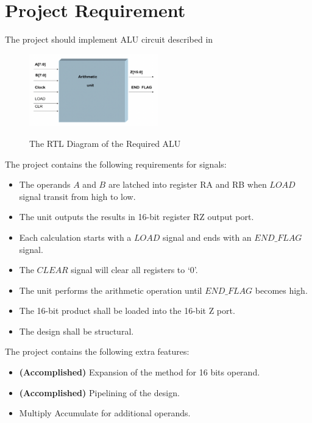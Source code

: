 \section{Project Requirement}

\noindent The project should implement ALU circuit described in 

\begin{figure}[!ht]
	\centering
	\caption{The RTL Diagram of the Required ALU}
	\includegraphics[width=0.5\textwidth]{../img/req_rtl.png}
	\label{fig:req_rtl}
\end{figure}

\noindent The project contains the following requirements for signals:

\begin{itemize}
	\item The operands \(A\) and \(B\) are latched into register RA and RB when \(LOAD\) signal transit from high to low.
	\item The unit outputs the results in 16-bit register RZ output port.
	\item Each calculation starts with a \(LOAD\) signal and ends with an \(END\_FLAG\) signal.
	\item The \(CLEAR\) signal will clear all registers to ‘0’.
	\item The unit performs the arithmetic operation until \(END\_FLAG\) becomes high.
	\item The 16-bit product shall be loaded into the 16-bit Z port.
	\item The design shall be structural.
\end{itemize}

\noindent The project contains the following extra features:

\begin{itemize}
	\item \textbf{(Accomplished)} Expansion of the method for 16 bits operand.
	\item \textbf{(Accomplished)} Pipelining of the design.
	\item Multiply Accumulate for additional operands.
\end{itemize}
